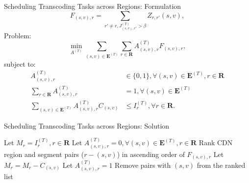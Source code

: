 \documentclass{beamer}
\newcommand{\comp}{C}
\newcommand{\TranscodeSet}{\mathbf{E}}
\newcommand{\IdleComp}{I}
\newcommand{\SegRepCost}{F}
\newcommand{\Assign}{A}
\newcommand{\ReqFromRegion}{J}
\newcommand{\CDNRegions}{\mathbf{R}}
\newcommand{\RegionRepCost}{Z}
\begin{document}
\begin{frame}{Scheduling Transcoding Tasks across Regions: Formulation}
	$$
	\SegRepCost_{(s,v),r} = \sum_{r' \ne r, \ReqFromRegion^{(T)}_{(s,v),r'} > \beta} \RegionRepCost_{r,r'}(s,v),
	$$
	Problem:
	\begin{equation}
	\min_{\Assign^{(T)}} \sum_{(s,v) \in \TranscodeSet^{(T)}} \sum_{r \in \CDNRegions} \Assign^{(T)}_{(s,v),r} \SegRepCost_{(s,v), r},
	\end{equation}
	subject to:
	\[
	\begin{split}
	\Assign^{(T)}_{(s,v),r} & \in \{0,1\}, \forall (s,v) \in \TranscodeSet^{(T)}, r \in \CDNRegions \\
	\sum_{r \in \CDNRegions} \Assign^{(T)}_{(s,v),r} &= 1, \forall (s,v) \in \TranscodeSet^{(T)}\\
	\sum_{(s,v) \in \TranscodeSet^{(T)}} \Assign^{(T)}_{(s,v),r} \comp_{(s,v)} & \le \IdleComp^{(T)}_r, \forall r \in \CDNRegions.
	\end{split}
	\]
\end{frame}

\renewcommand{\thealgorithm}{}

\begin{frame}[fragile]{Scheduling Transcoding Tasks across Regions: Solution}
	\begin{algorithm}[H]
		\caption{Transcoding task schedule.}\label{alg:transcoding-task-schedule}
		\begin{algorithmic}[H]	
			\STATE Let $M_{r} = \IdleComp^{(T)}_r, r \in \CDNRegions$
			\STATE Let $\Assign^{(T)}_{(s,v),r} = 0, \forall (s,v) \in \TranscodeSet^{(T)}, r \in \CDNRegions$
			\STATE Rank CDN region and segment pairs ($r-(s,v)$) in ascending order of $\SegRepCost_{(s,v),r}$
			\IF{$\comp_{(s,v)} \le M_r$}
			\STATE Let $M_r = M_r - \comp_{(s,v)}$
			\STATE Let $\Assign^{(T)}_{(s,v),r} = 1$
			\STATE Remove pairs with $(s,v)$ from the ranked list
			\ENDIF
			\ENDFOR
		\end{algorithmic}
	\end{algorithm}
\end{frame}
\end{document}
